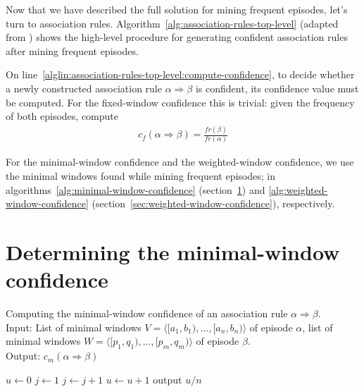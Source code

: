 Now that we have described the full solution for mining frequent episodes, let's turn to association rules. Algorithm~\ref{alg:association-rules-top-level} (adapted from \citep{mannila1997discovery}) shows the high-level procedure for generating confident association rules after mining frequent episodes.

On line~\ref{alglin:association-rules-top-level:compute-confidence}, to decide whether a newly constructed association rule $ \alpha \Rightarrow \beta $ is confident, its confidence value must be computed. For the fixed-window confidence this is trivial: given the frequency of both episodes, compute
\begin{align*}
c_f(\alpha \Rightarrow \beta) = \frac{fr(\beta)}{fr(\alpha)}
\end{align*}

For the minimal-window confidence and the weighted-window confidence, we use the minimal windows found while mining frequent episodes; in algorithms~\ref{alg:minimal-window-confidence} (section~\ref{sec:minimal-window-confidence}) and \ref{alg:weighted-window-confidence} (section~\ref{sec:weighted-window-confidence}), respectively.

\section{Determining the minimal-window confidence}
\label{sec:minimal-window-confidence}

\begin{algorithm}

\caption{Computing the minimal-window confidence of an association rule $ \alpha \Rightarrow \beta $.\\
Input: List of minimal windows $ V = \langle [a_1, b_1), \ldots, [a_n, b_n) \rangle $ of episode $ \alpha $, list of minimal windows $ W = \langle [p_1, q_1), \ldots, [p_m, q_m) \rangle $ of episode $ \beta $.\\
Output: $ c_m(\alpha \Rightarrow \beta) $
}

\begin{algorithmic}[1]

\State $ u \gets 0 $
\State $ j \gets 1 $
 \label{alglin:minimal-window-confidence:for}
     \label{alglin:minimal-window-confidence:while}
        \State $ j \gets j + 1 $
    \EndWhile
     $ u \gets u + 1 $ \label{alglin:minimal-window-confidence:increment}
    \EndIf
\EndFor
\State output $ u / n $

\end{algorithmic}

\label{alg:minimal-window-confidence}
\end{algorithm}

